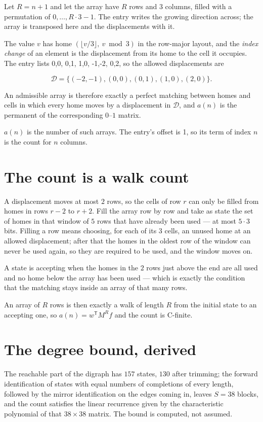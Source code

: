 \documentclass[11pt]{article}
\theoremstyle{definition}
\begin{document}
Let $R = n + 1$ and let the array have $R$ rows and $3$ columns, filled with a permutation of $0,\dots,R\cdot3-1$. The entry writes the growing direction across; the array is transposed here and the displacements with it.

The value $v$ has home $(\lfloor v/3\rfloor,\ v \bmod 3)$ in the row-major layout, and the {\itshape index change} of an element is the displacement from its home to the cell it occupies. The entry lists 0,0, 0,1, 1,0, -1,-2, 0,2, so the allowed displacements are

\[\mathcal{D} = \{(-2,-1), (0,0), (0,1), (1,0), (2,0)\}.\]

An admissible array is therefore exactly a perfect matching between homes and cells in which every home moves by a displacement in $\mathcal{D}$, and $a(n)$ is the permanent of the corresponding $0$--$1$ matrix.

$a(n)$ is the number of such arrays. The entry's offset is 1, so its term of index $n$ is the count for $n$ columns.

\section{The count is a walk count}

A displacement moves at most $2$ rows, so the cells of row $r$ can only be filled from homes in rows $r-2$ to $r+2$. Fill the array row by row and take as state the set of homes in that window of $5$ rows that have already been used --- at most $5\cdot3$ bits. Filling a row means choosing, for each of its $3$ cells, an unused home at an allowed displacement; after that the homes in the oldest row of the window can never be used again, so they are required to be used, and the window moves on.

A state is accepting when the homes in the $2$ rows just above the end are all used and no home below the array has been used --- which is exactly the condition that the matching stays inside an array of that many rows.

An array of $R$ rows is then exactly a walk of length $R$ from the initial state to an accepting one, so $a(n) = w^{\mathsf T}M^{R}f$ and the count is C-finite.

\section{The degree bound, derived}

The reachable part of the digraph has $157$ states, $130$ after trimming; the forward identification of states with equal numbers of completions of every length, followed by the mirror identification on the edges coming in, leaves $S = 38$ blocks, and the count satisfies the linear recurrence given by the characteristic polynomial of that $38\times38$ matrix. The bound is computed, not assumed.
\end{document}
